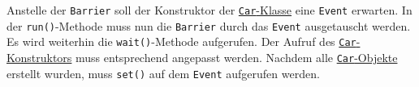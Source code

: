 Anstelle der \lstinline$Barrier$ soll der Konstruktor der \hyperref[threads:lst:auto]{\lstinline$Car$-Klasse}
eine \lstinline$Event$ erwarten.
In der \lstinline$run()$-Methode muss nun die \lstinline$Barrier$ durch das \lstinline$Event$ ausgetauscht
werden.
Es wird weiterhin die \lstinline$wait()$-Methode aufgerufen.
Der Aufruf des \hyperref[threads:lst:auto]{\lstinline$Car$-Konstruktors} muss entsprechend angepasst werden.
Nachdem alle \hyperref[threads:lst:auto]{\lstinline$Car$-Objekte} erstellt wurden, muss \lstinline$set()$
auf dem \lstinline$Event$ aufgerufen werden.